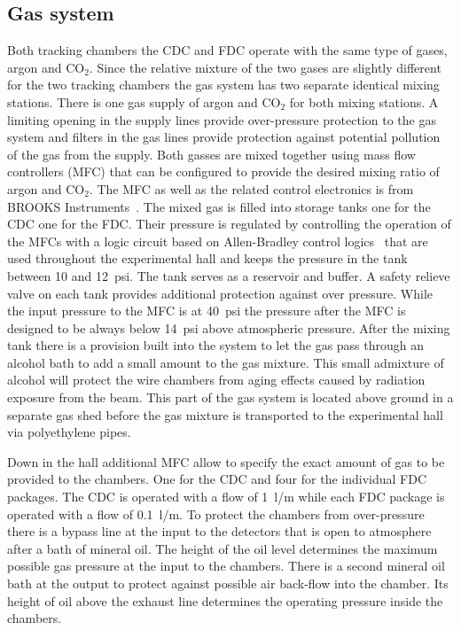 \subsection[Gas system (Beni)]{Gas system \label{sec:gas}}
Both tracking chambers the CDC and FDC operate with the same type of gases, argon and CO$_{2}$. Since the relative mixture of
the two gases are slightly different for the two tracking chambers the gas system has two separate identical mixing stations. There is one gas supply of argon and CO$_{2}$ for both mixing stations. A limiting opening in the supply
lines provide over-pressure protection to the gas system and filters in the gas lines provide protection against potential
pollution of the gas from the supply. Both gasses are mixed together using mass flow controllers (MFC) that can be 
configured
to provide the desired mixing ratio of argon and CO$_{2}$.  The MFC as well as the related control electronics is from
BROOKS Instruments~\cite{BrooksInst}.
The mixed gas is filled into storage tanks one for the CDC one for the FDC. Their pressure is
regulated by controlling the operation of the MFCs with a logic circuit based on Allen-Bradley control logics~\cite{AllenBradley} 
that are used throughout the experimental hall and keeps
the pressure in the tank between 10 and 12~psi. The tank serves as a reservoir and buffer.
A safety relieve valve on each tank
provides additional protection against over pressure. While the input pressure to the MFC is at 40~psi the pressure after
the MFC is designed to be always below 14~psi above atmospheric pressure. After the mixing tank there is a provision
built into the system to let the gas pass through an alcohol bath to add a small amount to the gas mixture.
This small admixture of alcohol will protect the wire chambers from aging effects caused by radiation exposure from the beam.
This part of the gas system is located above ground in a separate gas shed before the gas mixture is transported
to the experimental hall via polyethylene pipes.

Down in the hall additional MFC allow to specify the exact amount of gas to be provided to the chambers. One for the CDC
and four for the individual FDC packages. The CDC is operated with a flow of 1~l/m while each FDC package is operated with
a flow of 0.1~l/m. To protect the chambers from over-pressure there is a bypass line at the input to the detectors that
is open to atmosphere after a bath of mineral oil. The height of the oil level determines the maximum possible gas pressure at
the input to the chambers. There is a second mineral oil bath at the output to protect against possible air back-flow into
the chamber. Its height of oil above the exhaust line determines the operating pressure inside the chambers.

